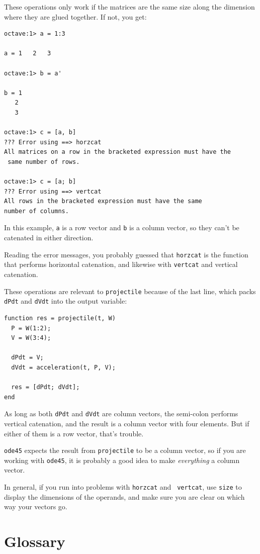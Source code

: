 \documentclass{book}
\begin{document}
These operations only work if the matrices are the same size along
the dimension where they are glued together. If not, you get:

\begin{verbatim}
octave:1> a = 1:3

a = 1   2   3

octave:1> b = a'

b = 1
   2
   3

octave:1> c = [a, b]
??? Error using ==> horzcat
All matrices on a row in the bracketed expression must have the 
 same number of rows.

octave:1> c = [a; b]
??? Error using ==> vertcat
All rows in the bracketed expression must have the same 
number of columns.
\end{verbatim}

In this example, {\tt a} is a row vector and {\tt b} is a column
vector, so they can't be catenated in either direction.

Reading the error messages, you probably guessed that {\tt horzcat}
is the function that performs horizontal catenation, and likewise
with {\tt vertcat} and vertical catenation.

These operations are relevant to {\tt projectile} because of the
last line, which packs {\tt dPdt} and {\tt dVdt} into the
output variable:

\begin{verbatim}
function res = projectile(t, W)
  P = W(1:2);
  V = W(3:4);

  dPdt = V;             
  dVdt = acceleration(t, P, V);

  res = [dPdt; dVdt];
end
\end{verbatim}

As long as both {\tt dPdt} and {\tt dVdt} are column vectors,
the semi-colon performs vertical catenation, and the result is
a column vector with four elements. But if either of them is a
row vector, that's trouble.

{\tt ode45} expects the result from {\tt projectile} to be a
column vector, so if you are working with {\tt ode45}, it is
probably a good idea to make {\em everything} a column vector.

In general, if you run into problems with {\tt horzcat} and {\tt
vertcat}, use {\tt size} to display the dimensions of the operands,
and make sure you are clear on which way your vectors go.


\section{Glossary}
\end{document}
